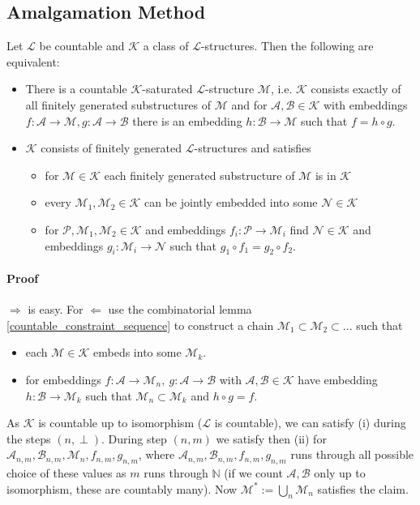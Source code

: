 \documentclass{scrartcl}
\newcommand{\N}{\mathbb{N}}
\begin{document}
\subsection{Amalgamation Method}
Let $\mathcal{L}$ be countable and $\mathcal{K}$ a class of $\mathcal{L}$-structures.
Then the following are equivalent:
\begin{itemize}
    \item There is a countable $\mathcal{K}$-saturated $\mathcal{L}$-structure $\mathcal{M}$, i.e. $\mathcal{K}$ consists exactly of all finitely generated substructures of $\mathcal{M}$ and for $\mathcal{A}, \mathcal{B} \in \mathcal{K}$ with embeddings $f: \mathcal{A} \to \mathcal{M}, g: \mathcal{A} \to \mathcal{B}$ there is an embedding $h: \mathcal{B} \to \mathcal{M}$ such that $f = h \circ g$.
    \item $\mathcal{K}$ consists of finitely generated $\mathcal{L}$-structures and satisfies
    \begin{itemize}
        \item for $\mathcal{M} \in \mathcal{K}$ each finitely generated substructure of $\mathcal{M}$ is in $\mathcal{K}$
        \item every $\mathcal{M}_1, \mathcal{M_2} \in \mathcal{K}$ can be jointly embedded into some $\mathcal{N} \in \mathcal{K}$
        \item for $\mathcal{P}, \mathcal{M}_1, \mathcal{M}_2 \in \mathcal{K}$ and embeddings $f_i: \mathcal{P} \to \mathcal{M}_i$ find $\mathcal{N} \in \mathcal{K}$ and embeddings $g_i: \mathcal{M}_i \to \mathcal{N}$ such that $g_1 \circ f_1 = g_2 \circ f_2$.
    \end{itemize}
\end{itemize}
\paragraph{Proof} $\Rightarrow$ is easy. 
For $\Leftarrow$ use the combinatorial lemma \ref{countable_constraint_sequence} to construct a chain $\mathcal{M}_1 \subset \mathcal{M}_2 \subset ...$ such that
\begin{itemize}
    \item each $\mathcal{M} \in \mathcal{K}$ embeds into some $\mathcal{M}_k$.
    \item for embeddings $f: \mathcal{A} \to \mathcal{M}_n, \ g: \mathcal{A} \to \mathcal{B}$ with $\mathcal{A}, \mathcal{B} \in \mathcal{K}$ have embedding $h: \mathcal{B} \to \mathcal{M}_k$ such that $\mathcal{M}_n \subset \mathcal{M}_k$ and $h \circ g = f$.
\end{itemize}
As $\mathcal{K}$ is countable up to isomorphism ($\mathcal{L}$ is countable), we can satisfy (i) during the steps $(n, \perp)$.
During step $(n, m)$ we satisfy then (ii) for $\mathcal{A}_{n, m}, \mathcal{B}_{n, m}, \mathcal{M}_n, f_{n, m}, g_{n, m}$, where $\mathcal{A}_{n, m}, \mathcal{B}_{n, m}, f_{n, m}, g_{n, m}$ runs through all possible choice of these values as $m$ runs through $\N$ (if we count $\mathcal{A}, \mathcal{B}$ only up to isomorphism, these are countably many).
Now $\mathcal{M}^* := \bigcup_n \mathcal{M}_n$ satisfies the claim.
\end{document}
